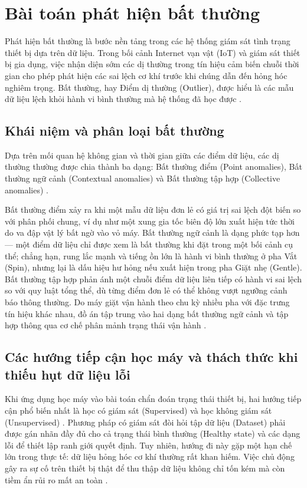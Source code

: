 \section{Bài toán phát hiện bất thường}

Phát hiện bất thường là bước nền tảng trong các hệ thống giám sát tình trạng thiết bị dựa trên dữ liệu. Trong bối cảnh Internet vạn vật (IoT) và giám sát thiết bị gia dụng, việc nhận diện sớm các dị thường trong tín hiệu cảm biến chuỗi thời gian cho phép phát hiện các sai lệch cơ khí trước khi chúng dẫn đến hỏng hóc nghiêm trọng. Bất thường, hay Điểm dị thường (Outlier), được hiểu là các mẫu dữ liệu lệch khỏi hành vi bình thường mà hệ thống đã học được \cite{ref_1_6}.

\subsection{Khái niệm và phân loại bất thường}

Dựa trên mối quan hệ không gian và thời gian giữa các điểm dữ liệu, các dị thường thường được chia thành ba dạng: Bất thường điểm (Point anomalies), Bất thường ngữ cảnh (Contextual anomalies) và Bất thường tập hợp (Collective anomalies) \cite{ref_1_6, ref_1_7}.

Bất thường điểm xảy ra khi một mẫu dữ liệu đơn lẻ có giá trị sai lệch đột biến so với phân phối chung, ví dụ như một xung gia tốc biên độ lớn xuất hiện tức thời do va đập vật lý bất ngờ vào vỏ máy. Bất thường ngữ cảnh là dạng phức tạp hơn — một điểm dữ liệu chỉ được xem là bất thường khi đặt trong một bối cảnh cụ thể; chẳng hạn, rung lắc mạnh và tiếng ồn lớn là hành vi bình thường ở pha Vắt (Spin), nhưng lại là dấu hiệu hư hỏng nếu xuất hiện trong pha Giặt nhẹ (Gentle). Bất thường tập hợp phản ánh một chuỗi điểm dữ liệu liên tiếp có hành vi sai lệch so với quy luật tổng thể, dù từng điểm đơn lẻ có thể không vượt ngưỡng cảnh báo thông thường. Do máy giặt vận hành theo chu kỳ nhiều pha với đặc trưng tín hiệu khác nhau, đồ án tập trung vào hai dạng bất thường ngữ cảnh và tập hợp thông qua cơ chế phân mảnh trạng thái vận hành \cite{ref_1_5}.

\subsection{Các hướng tiếp cận học máy và thách thức khi thiếu hụt dữ liệu lỗi}

Khi ứng dụng học máy vào bài toán chẩn đoán trạng thái thiết bị, hai hướng tiếp cận phổ biến nhất là học có giám sát (Supervised) và học không giám sát (Unsupervised) \cite{ref_1_5}. Phương pháp có giám sát đòi hỏi tập dữ liệu (Dataset) phải được gán nhãn đầy đủ cho cả trạng thái bình thường (Healthy state) và các dạng lỗi để thiết lập ranh giới quyết định. Tuy nhiên, hướng đi này gặp một hạn chế lớn trong thực tế: dữ liệu hỏng hóc cơ khí thường rất khan hiếm. Việc chủ động gây ra sự cố trên thiết bị thật để thu thập dữ liệu không chỉ tốn kém mà còn tiềm ẩn rủi ro mất an toàn \cite{ref_1_3}.

